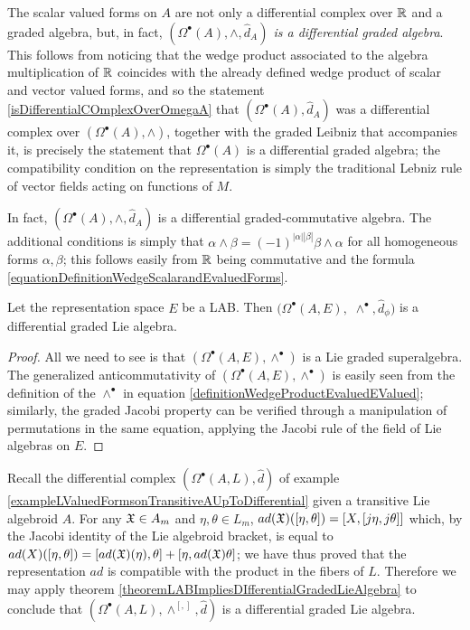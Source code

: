 \begin{example}
The scalar valued forms on $A$ are not only a differential complex over $\mathbb{R}$ and a graded algebra, but, in fact, \textit{$(\Omega^\bullet(A), \wedge, \hat d_A)$ is a differential graded algebra}. This follows from noticing that the wedge product associated to the algebra multiplication of $\mathbb{R}$ coincides with the already defined wedge product of scalar and vector valued forms, and so the statement \ref{isDifferentialCOmplexOverOmegaA} that $(\Omega^\bullet(A), \hat d_A)$ was a differential complex over $(\Omega^\bullet(A), \wedge)$, together with the graded Leibniz that accompanies it, is precisely the statement that $\Omega^\bullet(A)$ is a differential graded algebra; the compatibility condition on the representation is simply the traditional Lebniz rule of vector fields acting on functions of $M$.

In fact, $(\Omega^\bullet(A), \wedge, \hat d_A)$ is a differential graded-commutative algebra. The additional conditions is simply that $\alpha \wedge \beta = (-1)^{|\alpha||\beta|}\beta \wedge \alpha$ for all homogeneous forms $\alpha, \beta$; this follows easily from $\mathbb{R}$ being commutative and the formula \eqref{equationDefinitionWedgeScalarandEvaluedForms}.
\end{example}

\begin{theorem}\label{theoremLABImpliesDIfferentialGradedLieAlgebra}
Let the representation space $E$ be a LAB. Then $(\Omega^\bullet(A, E),$ $\wedge^\bullet, \hat d_\phi)$ is a differential graded Lie algebra.
\end{theorem}
\begin{proof}
All we need to see is that $(\Omega^\bullet(A, E), \wedge^\bullet)$ is a Lie graded superalgebra. The generalized anticommutativity of $(\Omega^\bullet(A, E), \wedge^\bullet)$ is easily seen from the definition of the $\wedge^\bullet$ in equation \eqref{definitionWedgeProductEvaluedEValued}; similarly, the graded Jacobi property can be verified through a manipulation of permutations in the same equation, applying the Jacobi rule of the field of Lie algebras on $E$. 
\end{proof}

\begin{example}\label{exampleOmegaALIsDIfferentialGradedLieAlgebra}
Recall the differential complex $(\Omega^\bullet(A, L), \hat d)$ of example \ref{exampleLValuedFormsonTransitiveAUpToDifferential} given a transitive Lie algebroid $A$. For any $\mathfrak{X} \in A_m$ and $\eta, \theta \in L_m$, $ad(\mathfrak{X})([\eta, \theta]) = [X, [j\eta, j\theta]]$ which, by the Jacobi identity of the Lie algebroid bracket, is equal to $ad(X)([\eta, \theta]) = [ad(\mathfrak{X})(\eta), \theta] + [\eta, ad(\mathfrak{X}) \theta]$; we have thus proved that the representation $ad$ is compatible with the product in the fibers of $L$. Therefore we may apply theorem \ref{theoremLABImpliesDIfferentialGradedLieAlgebra} to conclude that $(\Omega^\bullet(A, L), \wedge^{[,]}, \hat d)$ is a differential graded Lie algebra.
\end{example}


